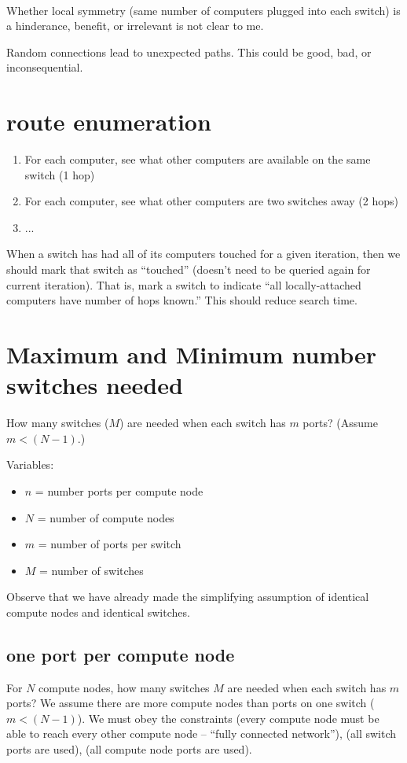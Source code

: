 \documentclass[pdftex]{article}
\begin{document}
\ \\
Whether local symmetry (same number of computers plugged into each switch) is a hinderance, benefit, or irrelevant is not clear to me.

Random connections lead to unexpected paths. This could be good, bad, or inconsequential.

\section{route enumeration}

\begin{enumerate}
 \item For each computer, see what other computers are available on the same switch (1 hop)
 \item For each computer, see what other computers are two switches away (2 hops)
 \item ...
\end{enumerate}
When a switch has had all of its computers touched for a given iteration, then we should mark that switch as ``touched'' (doesn't need to be queried again for current iteration). That is, mark a switch to indicate ``all locally-attached computers have number of hops known.'' This should reduce search time.

\section{Maximum and Minimum number switches needed}
How many switches ($M$) are needed when each switch has $m$ ports? (Assume $m<(N-1)$.)

Variables: 
\begin{itemize}
 \item $n$ = number ports per compute node
 \item $N$ = number of compute nodes
\item $m$ = number of ports per switch
 \item $M$ = number of switches
\end{itemize}
Observe that we have already made the simplifying assumption of identical compute nodes and identical switches.

\subsection{one port per compute node}
For $N$ compute nodes, how many switches $M$ are needed when each switch has $m$ ports? We assume there are more compute nodes than ports on one switch ($m<(N-1)$). We must obey the constraints (every compute node must be able to reach every other compute node -- ``fully connected network''), (all switch ports are used), (all compute node ports are used).
\end{document}
